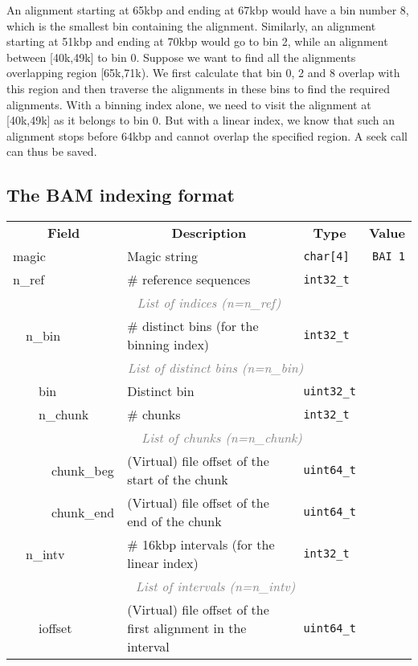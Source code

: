 \documentclass[10pt]{article}
\begin{document}
An alignment starting at 65kbp and ending at 67kbp would have a bin
number 8, which is the smallest bin containing the alignment. Similarly,
an alignment starting at 51kbp and ending at 70kbp would go to bin 2,
while an alignment between [40k,49k] to bin 0. Suppose we want to find
all the alignments overlapping region [65k,71k). We first calculate that
bin 0, 2 and 8 overlap with this region and then traverse the alignments
in these bins to find the required alignments. With a binning index
alone, we need to visit the alignment at [40k,49k] as it belongs to bin
0. But with a linear index, we know that such an alignment stops before
64kbp and cannot overlap the specified region. A seek call can thus be
saved.

\subsection{The BAM indexing format}
\begin{table}[h]
{\small
\begin{tabular}{|l|l|l|l|l|l|r|}
  \cline{1-7}
  \multicolumn{4}{|c|}{\bf Field} & \multicolumn{1}{c|}{\bf Description} & \multicolumn{1}{c|}{\bf Type} & \multicolumn{1}{c|}{\bf Value} \\\cline{1-7}
  \multicolumn{4}{|l|}{\sf magic} & Magic string & {\tt char[4]} & {\tt BAI\char92 1}\\\cline{1-7}
  \multicolumn{4}{|l|}{\sf n\_ref} & \# reference sequences & {\tt int32\_t} & \\\cline{1-7}
  \multicolumn{7}{|c|}{\textcolor{gray}{\it List of indices (n=n\_ref)}} \\\cline{2-7}
  & \multicolumn{3}{l|}{\sf n\_bin} & \# distinct bins (for the binning index) & {\tt int32\_t} & \\\cline{2-7}
  & \multicolumn{6}{c|}{\textcolor{gray}{\it List of distinct bins (n=n\_bin)}} \\\cline{3-7}
  & & \multicolumn{2}{l|}{\sf bin} & Distinct bin & {\tt uint32\_t} & \\\cline{3-7}
  & & \multicolumn{2}{l|}{\sf n\_chunk} & \# chunks & {\tt int32\_t} & \\\cline{3-7}
  & & \multicolumn{5}{c|}{\textcolor{gray}{\it List of chunks (n=n\_chunk)}} \\\cline{4-7}
  & & & {\sf chunk\_beg} & (Virtual) file offset of the start of the chunk & {\tt uint64\_t} & \\\cline{4-7}
  & & & {\sf chunk\_end} & (Virtual) file offset of the end of the chunk & {\tt uint64\_t} & \\\cline{2-7}
  & \multicolumn{3}{l|}{\sf n\_intv} & \# 16kbp intervals (for the linear index) & {\tt int32\_t} & \\\cline{2-7}
  & \multicolumn{6}{c|}{\textcolor{gray}{\it List of intervals (n=n\_intv)}} \\\cline{3-7}
  & & \multicolumn{2}{l|}{\sf ioffset} & (Virtual) file offset of the first alignment in the interval & {\tt uint64\_t} & \\
  \cline{1-7}
\end{tabular}}
\end{table}
\end{document}
